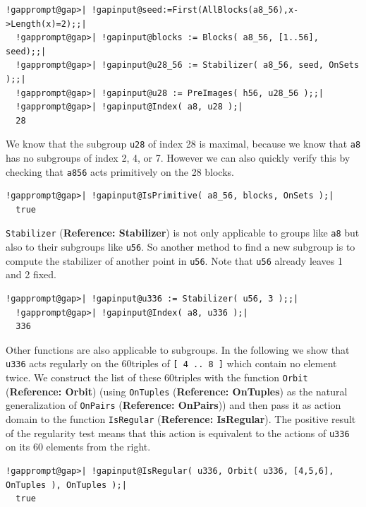 \documentclass[a4paper,11pt]{report}
\begin{document}
{{ 
\begin{Verbatim}[commandchars=!@|,fontsize=\small,frame=single,label=Example]
  !gapprompt@gap>| !gapinput@seed:=First(AllBlocks(a8_56),x->Length(x)=2);;|
  !gapprompt@gap>| !gapinput@blocks := Blocks( a8_56, [1..56], seed);;|
  !gapprompt@gap>| !gapinput@u28_56 := Stabilizer( a8_56, seed, OnSets );;|
  !gapprompt@gap>| !gapinput@u28 := PreImages( h56, u28_56 );;|
  !gapprompt@gap>| !gapinput@Index( a8, u28 );|
  28
\end{Verbatim}
 

 We know that the subgroup \texttt{u28} of index 28 is maximal, because we know that \texttt{a8} has no subgroups of index 2, 4, or 7. However we can also quickly verify this
by checking that \texttt{a8{\textunderscore}56} acts primitively on the 28 blocks. 

 
\begin{Verbatim}[commandchars=!@|,fontsize=\small,frame=single,label=Example]
  !gapprompt@gap>| !gapinput@IsPrimitive( a8_56, blocks, OnSets );|
  true
\end{Verbatim}
 

 \texttt{Stabilizer} (\textbf{Reference: Stabilizer}) is not only applicable to groups like \texttt{a8} but also to their subgroups like \texttt{u56}. So another method to find a new subgroup is to compute the stabilizer of
another point in \texttt{u56}. Note that \texttt{u56} already leaves 1 and 2 fixed. 

 
\begin{Verbatim}[commandchars=!@|,fontsize=\small,frame=single,label=Example]
  !gapprompt@gap>| !gapinput@u336 := Stabilizer( u56, 3 );;|
  !gapprompt@gap>| !gapinput@Index( a8, u336 );|
  336
\end{Verbatim}
 

 Other functions are also applicable to subgroups. In the following we show
that \texttt{u336} acts regularly on the 60{\nobreakspace}triples of \texttt{[ 4 .. 8 ]} which contain no element twice. We construct the list of these
60{\nobreakspace}triples with the function \texttt{Orbit} (\textbf{Reference: Orbit}) (using \texttt{OnTuples} (\textbf{Reference: OnTuples}) as the natural generalization of \texttt{OnPairs} (\textbf{Reference: OnPairs})) and then pass it as action domain to the function \texttt{IsRegular} (\textbf{Reference: IsRegular}). The positive result of the regularity test means that this action is
equivalent to the actions of \texttt{u336} on its 60 elements from the right. 

 
\begin{Verbatim}[commandchars=!@|,fontsize=\small,frame=single,label=Example]
  !gapprompt@gap>| !gapinput@IsRegular( u336, Orbit( u336, [4,5,6], OnTuples ), OnTuples );|
  true
\end{Verbatim}
 

}}
\end{document}

